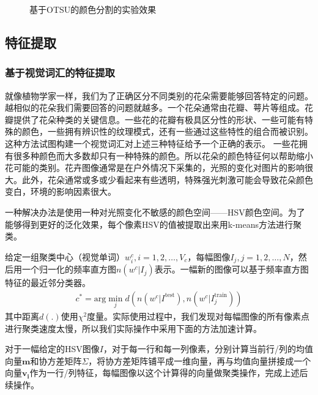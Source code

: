 \documentclass[supercite]{HustGraduPaper}
\begin{document}
\begin{sloppypar}
\begin{figure}[H]
    \caption{基于OTSU的颜色分割的实验效果}
    \end{figure}
  \subsection{特征提取}
  \subsubsection{基于视觉词汇的特征提取}
  就像植物学家一样，我们为了正确区分不同类别的花朵需要能够回答特定的问题。越相似的花朵我们需要回答的问题就越多\cite{1640927}。一个花朵通常由花瓣、萼片等组成。花瓣提供了花朵种类的关键信息。一些花的花瓣有极具区分性的形状、一些可能有特殊的颜色，一些拥有辨识性的纹理模式，还有一些通过这些特性的组合而被识别。这种方法试图构建一个视觉词汇对上述三种特征给予一个正确的表示。
  一些花拥有很多种颜色而大多数却只有一种特殊的颜色。所以花朵的颜色特征何以帮助缩小花可能的类别。花卉图像通常是在户外情况下采集的，光照的变化对图片的影响很大。此外，花朵通常或多或少看起来有些透明，特殊强光刺激可能会导致花朵颜色变白，环境的影响因素很大。

  一种解决办法是使用一种对光照变化不敏感的颜色空间——HSV颜色空间。为了能够得到更好的泛化效果，每个像素HSV的值被提取出来用k-means方法进行聚类。
  
  给定一组聚类中心（视觉单词）$w^c_i,i=1,2,\dots,V_c$，每幅图像$I_j,j=1,2,\dots,N$，然后用一个归一化的频率直方图$n(w^c|I_j)$表示。一幅新的图像可以基于频率直方图特征的最近邻分类器。\begin{gather}
    c^*=\text{arg}\min_j d(n(w^c|I^{\text{test}}),n(w^c|I^{\text{train}}_j))
  \end{gather}
  其中距离$d(.)$使用$\chi^2$度量。实际使用过程中，我们发现对每幅图像的所有像素点进行聚类速度太慢，所以我们实际操作中采用下面的方法加速计算。

  对于一幅给定的HSV图像$I$，对于每一行和每一列像素，分别计算当前行/列的均值向量$\bm{m}$和协方差矩阵$\Sigma$，将协方差矩阵铺平成一维向量，再与均值向量拼接成一个向量$\bm{v_i}$作为一行/列特征，每幅图像以这个计算得的向量做聚类操作，完成上述后续操作。


\end{sloppypar}
\end{document}

